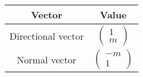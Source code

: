 \begin{center}
    \begin{tabular}{|c|c|} 
        \hline
            \textbf{Vector} & \textbf{Value} \\ 
        \hline
            Directional vector & $\begin{pmatrix}1 \\m \end{pmatrix} $\\ 
        \hline
            Normal vector & $\begin{pmatrix}-m \\1\end{pmatrix}$\\ 
        \hline
    \end{tabular}
\end{center}  
